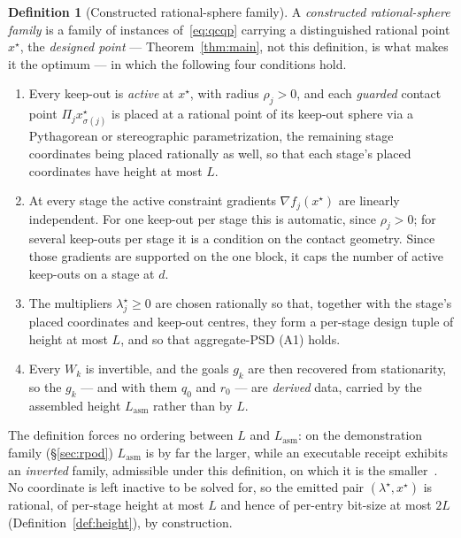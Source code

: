 \documentclass[11pt]{article}
\theoremstyle{definition}
\newtheorem{definition}{Definition}
\theoremstyle{remark}
\renewcommand{\_}{\ifdim\fontdimen3\font=0pt\relax\char`\_\else\textunderscore\fi\hspace{0pt}}
\begin{document}
\begin{definition}[Constructed rational-sphere family]\label{def:constructed}
A \emph{constructed rational-sphere family} is a family of instances
of~\eqref{eq:qcqp} carrying a distinguished rational point $x^\star$, the
\emph{designed point} --- Theorem~\ref{thm:main}, not this definition, is what
makes it the optimum --- in which the following four conditions hold.
\begin{enumerate}
\item[(i)] Every keep-out is \emph{active} at $x^\star$, with radius
$\rho_j>0$, and each \emph{guarded} contact point $\Pi_jx^\star_{\sigma(j)}$
is placed at a rational point of its keep-out sphere via a Pythagorean or
stereographic parametrization, the remaining stage coordinates being placed
rationally as well, so that each stage's placed coordinates have height at
most $L$.
\item[(ii)] At every stage the active constraint gradients
$\nabla f_j(x^\star)$ are linearly independent. For one keep-out per stage
this is automatic, since $\rho_j>0$; for several keep-outs per stage it is a
condition on the contact geometry. Since those gradients are supported on the
one block, it caps the number of active keep-outs on a stage at $d$.
\item[(iii)] The multipliers $\lambda^\star_j\ge0$ are chosen rationally so
that, together with the stage's placed coordinates and keep-out centres, they
form a per-stage design tuple of height at most $L$, and so that
aggregate-PSD (A1) holds.
\item[(iv)] Every $W_k$ is invertible, and the goals $g_k$ are then recovered
from stationarity, so the $g_k$ --- and with them $q_0$ and $r_0$ --- are
\emph{derived} data, carried by the assembled height $L_{\mathrm{asm}}$
rather than by $L$.
\end{enumerate}
The definition forces no ordering between $L$ and $L_{\mathrm{asm}}$: on the
demonstration family (\S\ref{sec:rpod}) $L_{\mathrm{asm}}$ is by far the
larger, while an executable receipt exhibits an \emph{inverted} family,
admissible under this definition, on which it is the
smaller~\cite{leannote}. No coordinate is left inactive to
be solved for, so the emitted pair $(\lambda^\star,x^\star)$ is rational, of
per-stage height at most $L$ and hence of per-entry bit-size at most $2L$
(Definition~\ref{def:height}), by construction.
\end{definition}
\end{document}
